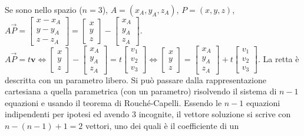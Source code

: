 \documentclass{article}
\begin{document}
Se sono nello spazio ($n=3$), $A=\left( x_{A},y_{A},z_{A}\right) $, $%
P=\left( x,y,z\right) $, $A\vec{P}=\left[ 
\begin{array}{c}
x-x_{A} \\ 
y-y_{A} \\ 
z-z_{A}%
\end{array}%
\right] =\left[ 
\begin{array}{c}
x \\ 
y \\ 
z%
\end{array}%
\right] -\left[ 
\begin{array}{c}
x_{A} \\ 
y_{A} \\ 
z_{A}%
\end{array}%
\right] $. $A\vec{P}=t\mathbf{v\Longleftrightarrow }\left[ 
\begin{array}{c}
x \\ 
y \\ 
z%
\end{array}%
\right] -\left[ 
\begin{array}{c}
x_{A} \\ 
y_{A} \\ 
z_{A}%
\end{array}%
\right] =t\left[ 
\begin{array}{c}
v_{1} \\ 
v_{2} \\ 
v_{3}%
\end{array}%
\right] \Longleftrightarrow \left[ 
\begin{array}{c}
x \\ 
y \\ 
z%
\end{array}%
\right] =\left[ 
\begin{array}{c}
x_{A} \\ 
y_{A} \\ 
z_{A}%
\end{array}%
\right] +t\left[ 
\begin{array}{c}
v_{1} \\ 
v_{2} \\ 
v_{3}%
\end{array}%
\right] $. La retta \`{e} descritta con un parametro libero. Si pu\`{o}
passare dalla rappresentazione cartesiana a quella parametrica (con un
parametro) risolvendo il sistema di $n-1$ equazioni e usando il teorema di
Rouch\'{e}-Capelli. Essendo le $n-1$ equazioni indipendenti per ipotesi ed
avendo $3$ incognite, il vettore soluzione si scrive con $n-\left(
n-1\right) +1=2$ vettori, uno dei quali \`{e} il coefficiente di un
\end{document}
